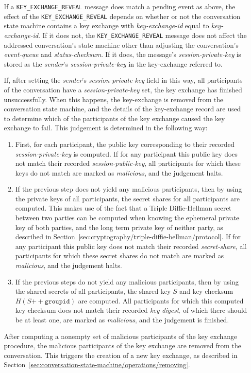 \documentclass{article}
\def\npmessage#1{\texttt{#1}}
\def\field#1{\textit{#1}}
\def\smfield#1{\textsl{#1}}
\def\type#1{\textsf{#1}}
\def\concat{\mathbin{+\!\!\!+}}
\begin{document}
If a \npmessage{KEY\_EXCHANGE\_REVEAL} message does match a pending event as above, the effect of the \npmessage{KEY\_EXCHANGE\_REVEAL} depends on whether or not the conversation state machine contains a key exchange with \smfield{key-exchange-id} equal to \field{key-exchange-id}.
If it does not, the \npmessage{KEY\_EXCHANGE\_REVEAL} message does not affect the addressed conversation's state machine other than adjusting the conversation's \smfield{event-queue} and \smfield{status-checksum}.
If it does, the message's \field{session-private-key} is stored as the \field{sender}'s \smfield{session-private-key} in the \type{key-exchange} referred to.

If, after setting the \field{sender}'s \smfield{session-private-key} field in this way, all participants of the conversation have a \smfield{session-private-key} set, the key exchange has finished unsuccessfully.
When this happens, the \type{key-exchange} is removed from the conversation state machine, and the details of the \type{key-exchange} record are used to determine which of the participants of the key exchange caused the key exchange to fail.
This judgement is determined in the following way:
\begin{enumerate}
\item First, for each participant, the public key corresponding to their recorded \smfield{session-private-key} is computed. If for any participant this public key does not match their recorded \smfield{session-public-key}, all participants for which these keys do not match are marked as \emph{malicious}, and the judgement halts.
\item If the previous step does not yield any malicious participants, then by using the private keys of all participants, the secret shares for all participants are computed. This makes use of the fact that a Triple Diffie-Hellman secret between two parties can be computed when knowing the ephemeral private key of both parties, and the long term private key of neither party, as described in Section~\ref{sec:cryptography/triple-diffie-hellman/protocol}. If for any participant this public key does not match their recorded \smfield{secret-share}, all participants for which these secret shares do not match are marked as \emph{malicious}, and the judgement halts.
\item If the previous steps do not yield any malicious participants, then by using the shared secrets of all participants, the shared key $S$ and key checksum $H(S \concat \texttt{groupid})$ are computed. All participants for which this computed key checksum does not match their recorded \smfield{key-digest}, of which there should be at least one, are marked as \emph{malicious}, and the judgement is finished.
\end{enumerate}
After computing a nonempty set of malicious participants of the key exchange procedure, the malicious participants of the key exchange are removed from the conversation.
This triggers the creation of a new key exchange, as described in Section~\ref{sec:conversation-state-machine/operations/removing}.
\end{document}
